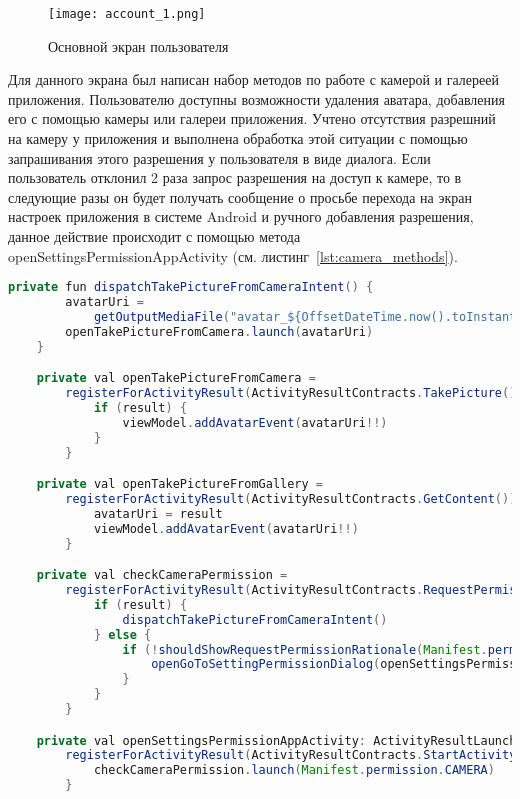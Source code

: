 \begin{figure}[H]
 \centering
   \texttt{[image: account\_1.png]} 
   \caption{Основной экран пользователя}
   \label{fig:arch:account_1}
\end{figure}


Для данного экрана был написан набор методов по работе с камерой и галереей приложения. Пользователю доступны возможности удаления аватара, добавления его с помощью камеры или галереи приложения. Учтено отсутствия разрешний на камеру у приложения и выполнена обработка этой ситуации с помощью запрашивания этого разрешения у пользователя в виде диалога. Если пользователь отклонил 2 раза запрос разрешения на доступ к камере, то в следующие разы он будет получать сообщение о просьбе перехода на экран настроек приложения в системе Android и ручного добавления разрешения, данное действие происходит с помощью метода openSettingsPermissionAppActivity (см. листинг~\ref{lst:camera_methods}).
\begin{lstlisting}[language=Java,label={lst:camera_methods},caption={Методы для взаимодействия с камерой}]
private fun dispatchTakePictureFromCameraIntent() {
        avatarUri =
            getOutputMediaFile("avatar_${OffsetDateTime.now().toInstant().toEpochMilli()}.jpg")
        openTakePictureFromCamera.launch(avatarUri)
    }

    private val openTakePictureFromCamera =
        registerForActivityResult(ActivityResultContracts.TakePicture()) { result ->
            if (result) {
                viewModel.addAvatarEvent(avatarUri!!)
            }
        }

    private val openTakePictureFromGallery =
        registerForActivityResult(ActivityResultContracts.GetContent()) { result ->
            avatarUri = result
            viewModel.addAvatarEvent(avatarUri!!)
        }

    private val checkCameraPermission =
        registerForActivityResult(ActivityResultContracts.RequestPermission()) { result ->
            if (result) {
                dispatchTakePictureFromCameraIntent()
            } else {
                if (!shouldShowRequestPermissionRationale(Manifest.permission.CAMERA)) {
                    openGoToSettingPermissionDialog(openSettingsPermissionAppActivity)
                }
            }
        }

    private val openSettingsPermissionAppActivity: ActivityResultLauncher<Intent> =
        registerForActivityResult(ActivityResultContracts.StartActivityForResult()) {
            checkCameraPermission.launch(Manifest.permission.CAMERA)
        }
\end{lstlisting}

